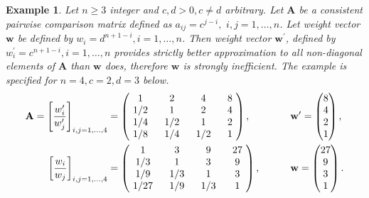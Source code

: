 \documentclass{article}
\theoremstyle{plain}
\newtheorem{example}{Example}[section]
\begin{document}
\begin{example}  \label{example:1}
Let $n \geq 3$ integer and $c, d > 0, c \neq d$ arbitrary. Let
$\mathbf{A}$ be a consistent pairwise comparison matrix def{\kern0pt}ined as
$a_{ij} = c^{j-i}, \, \, i,j=1,\ldots,n$. Let weight vector
$\mathbf{w}$ be def{\kern0pt}ined by $w_i = d^{n+1-i}, i=1,\ldots,n$. Then
weight vector $\mathbf{w^{\prime}}$, def{\kern0pt}ined by $w^{\prime}_i =
c^{n+1-i}, i=1,\ldots,n$ provides strictly better approximation to
all non-diagonal elements of $\mathbf{A}$ than $\mathbf{w}$ does,
therefore $\mathbf{w}$ is strongly
inef{\kern0pt}f{\kern0pt}icient. The example is specif{\kern0pt}ied for
$n=4, c=2, d=3$ below.
\begin{align*}
\mathbf{A} =  \left[\frac{w^{\prime}_i}{w^{\prime}_j}\right]_{i,j=1,\ldots,4} &=
\begin{pmatrix}
$\,\,$   1   $\,\,$ & $\,\,$   2   $\,\,$ & $\,\,$   4   $\,\,$ & $\,\,$   8   $\,\,$   \\
$\,\,$  1/2  $\,\,$ & $\,\,$   1   $\,\,$ & $\,\,$   2   $\,\,$ & $\,\,$   4   $\,\,$   \\
$\,\,$  1/4  $\,\,$ & $\,\,$  1/2  $\,\,$ & $\,\,$   1   $\,\,$ & $\,\,$   2   $\,\,$   \\
$\,\,$  1/8  $\,\,$ & $\,\,$  1/4  $\,\,$ & $\,\,$  1/2  $\,\,$ & $\,\,$   1   $\,\,$
\end{pmatrix},
\qquad
\qquad
\mathbf{w^{\prime}} =
\begin{pmatrix}
8  \\
4  \\
2  \\
1
\end{pmatrix},    \\
\left[\frac{w_i}{w_j}\right]_{i,j=1,\ldots,4} &=
\begin{pmatrix}
$\,\,$   1   $\,\,$ & $\,\,$   3   $\,\,$ & $\,\,$   9   $\,\,$ & $\,\,$  27   $\,\,$   \\
$\,\,$  1/3  $\,\,$ & $\,\,$   1   $\,\,$ & $\,\,$   3   $\,\,$ & $\,\,$   9   $\,\,$   \\
$\,\,$  1/9  $\,\,$ & $\,\,$  1/3  $\,\,$ & $\,\,$   1   $\,\,$ & $\,\,$   3   $\,\,$   \\
$\,\,$  1/27 $\,\,$ & $\,\,$  1/9  $\,\,$ & $\,\,$  1/3  $\,\,$ & $\,\,$   1   $\,\,$
\end{pmatrix},
\qquad
\quad
\mathbf{w} =
\begin{pmatrix}
27  \\
9   \\
3   \\
1
\end{pmatrix}.
\end{align*}
\end{example}
\end{document}
